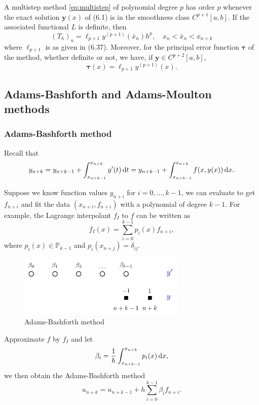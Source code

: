 \documentclass[10pt]{amsart}
\begin{document}
\begin{theorem}
A multistep method \eqref{eq:multistep} of polynomial degree $p$ has order $p$ whenever the exact solution $\boldsymbol{y}(x)$ of (6.1) is in the smoothness class $C^{p+1}[a, b]$. If the associated functional $L$ is definite, then
$$
\left({T}_h\right)_n=\ell_{p+1} {y}^{(p+1)}\left(\bar{x}_n\right) h^p, \quad x_n<\bar{x}_n<x_{n+k}
$$
where $\ell_{p+1}$ is as given in (6.37). Moreover, for the principal error function $\boldsymbol{\tau}$ of the method, whether definite or not, we have, if $\boldsymbol{y} \in C^{p+2}[a, b]$,
$$
\boldsymbol{\tau}(x)=\ell_{p+1} {y}^{(p+1)}(x).
$$
\end{theorem}

\subsection{Adams-Bashforth and Adams-Moulton methods}

\subsubsection{Adams-Bashforth method}
Recall that 
\begin{equation}
y_{n+k} = y_{n+k-1} + \int_{x_{n+k-1}}^{x_{n+k}} y'(t)\,{\rm d} t = y_{n+k-1} + \int_{x_{n+k-1}}^{x_{n+k}} f(x, y(x))\,{\rm d}x.
\end{equation}

Suppose we know function values $y_{n+i}$ for $i=0,\ldots, k-1$, we can evaluate to get $f_{n+i}$ and fit the data $(x_{n+i}, f_{n+i})$ with a polynomial of degree $k-1$. For example, the Lagrange interpolant $f_I$ to $f$ can be written as 
$$
f_I(x) = \sum_{i=0}^{k-1}p_i(x) f_{n+i},
$$
where $p_i(x)\in \mathbb P_{k-1}$ and $p_i(x_{n+j}) = \delta_{ij}$. 

\begin{figure}[htbp]
\begin{center}
\includegraphics[width=8cm]{figures/ABmethod.pdf}
\caption{Adams-Bashforth method}
\label{fig:multistep}
\end{center}
\end{figure}

Approximate $f$ by $f_I$ and let $$\beta_i = \frac{1}{h}\int_{x_{n+k-1}}^{x_{n+k}} p_i(x) \,{\rm d}x,$$ we then obtain the Adams-Bashforth method
\begin{equation}
u_{n+k} = u_{n+k-1} + h \sum_{i=0}^{k-1}\beta_i f_{n+i}.
\end{equation}
\end{document}
